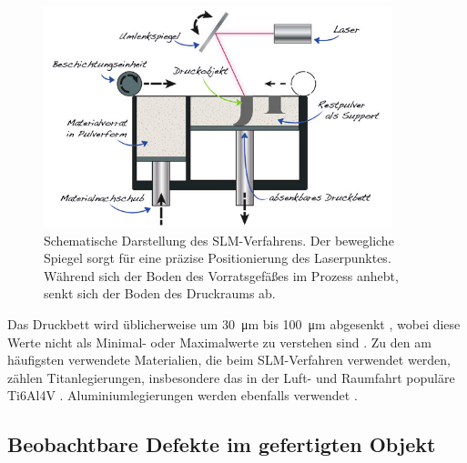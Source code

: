 		\begin{figure}[!ht]
			\centering
			\includegraphics[width=0.9\textwidth]{chapter/main/img/sls_slm.png}
			\caption[Schematische Darstellung des SLM-Verfahrens]{Schematische Darstellung des
			SLM-Verfahrens. Der bewegliche Spiegel sorgt für eine präzise Positionierung des
			Laserpunktes. Während sich der Boden des Vorrats\-gefäßes im Prozess anhebt, senkt
			sich der Boden des Druckraums ab. \cite[S. 119]{horsch20143d}}
			\label{fig:slm_sls}
		\end{figure}

		Das Druckbett wird üblicherweise um \SI{30}{\micro\meter} bis \SI{100}{\micro\meter}
		abgesenkt \cite{song2012effects}, wobei diese Werte nicht als Minimal- oder Maximalwerte
		zu verstehen sind \cite{shi2016performance}. Zu den am häufigsten verwendete Materialien,
		die beim SLM-Verfahren verwendet werden, zählen Titanlegierungen, insbesondere das in der
		Luft- und Raumfahrt populäre Ti6Al4V
		\cite{song2012effects,shi2016performance,brandl2012morphology}. Aluminiumlegierungen
		werden ebenfalls verwendet \cite[je AlSi10Mg]{yan2020comparative,zou2017study}.

	\subsection{Beobachtbare Defekte im gefertigten Objekt}
